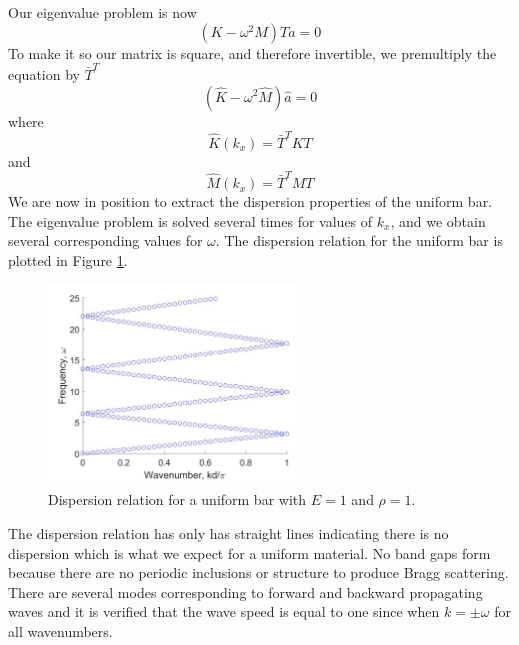 \documentclass{article}
\begin{document}
Our eigenvalue problem is now
\begin{equation}
(K-\omega^2M)T\hat{a} = 0
\end{equation}
To make it so our matrix is square, and therefore invertible, we premultiply 
the equation by $\bar{T}^T$
\begin{equation} \label{evalprob}
(\hat{K} - \omega^2 \hat{M})\hat{a} = 0
\end{equation}
where
\begin{equation}
\hat{K}(k_x) = \bar{T}^T K T
\end{equation}
and 
\begin{equation}
\hat{M}(k_x) = \bar{T}^T M T
\end{equation}
We are now in position to extract the dispersion properties of the uniform bar. 
The eigenvalue problem is solved several times for values of $k_x$, and we 
obtain several corresponding values for $\omega$. The dispersion relation for 
the uniform bar is plotted in Figure \ref{fig:unifbar}.
\begin{figure}[!htbp]
	\centering
	\includegraphics[width=0.6\textwidth]{unifbar.pdf}
	\caption{Dispersion relation for a uniform bar with $E=1$ and $\rho=1$.}
	\label{fig:unifbar}
\end{figure}
The dispersion relation has only has straight lines indicating there is no 
dispersion which is what we expect for a uniform material. No band gaps form 
because there are no periodic inclusions or structure to produce Bragg 
scattering. There are several modes corresponding to forward and backward 
propagating waves and it is verified that the wave speed is equal to one since 
when $k=\pm \omega$ for all wavenumbers.
\end{document}

